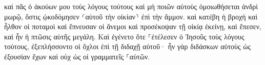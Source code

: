 \documentclass{openreader}
\begin{document}
καὶ πᾶς ὁ ἀκούων μου τοὺς λόγους τούτους καὶ μὴ ποιῶν αὐτοὺς ὁμοιωθήσεται ἀνδρὶ μωρῷ, ὅστις ᾠκοδόμησεν ⸂αὐτοῦ τὴν οἰκίαν⸃ ἐπὶ τὴν ἄμμον. 
καὶ κατέβη ἡ βροχὴ καὶ ἦλθον οἱ ποταμοὶ καὶ ἔπνευσαν οἱ ἄνεμοι καὶ προσέκοψαν τῇ οἰκίᾳ ἐκείνῃ, καὶ ἔπεσεν, καὶ ἦν ἡ πτῶσις αὐτῆς μεγάλη. 
Καὶ ἐγένετο ὅτε ⸀ἐτέλεσεν ὁ Ἰησοῦς τοὺς λόγους τούτους, ἐξεπλήσσοντο οἱ ὄχλοι ἐπὶ τῇ διδαχῇ αὐτοῦ· 
ἦν γὰρ διδάσκων αὐτοὺς ὡς ἐξουσίαν ἔχων καὶ οὐχ ὡς οἱ γραμματεῖς ⸀αὐτῶν. 
\end{document}
